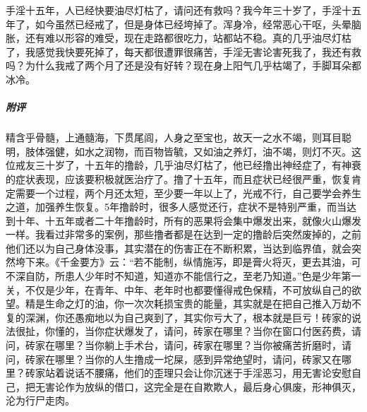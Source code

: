 \begin{case}
    手淫十五年，人已经快要油尽灯枯了，请问还有救吗？我今年三十岁了，手淫十五年了，如今虽然已经戒了，但是身体已经垮掉了。浑身冷，经常恶心干呕，头晕脑胀，还有难以形容的难受，现在走路都很吃力，站都站不稳。真的几乎油尽灯枯了，我感觉我快要死掉了，每天都很遭罪很痛苦，手淫无害论害死我了，我还有救吗？为什么我戒了两个月了还是没有好转？现在身上阳气几乎枯竭了，手脚耳朵都冰冷。
    \subparagraph{附评} 精含乎骨髓，上通髓海，下贯尾闾，人身之至宝也，故天一之水不竭，则耳目聪明，肢体强健，如水之润物，而百物皆毓，又如油之养灯，油不竭，则灯不灭。这位戒友三十岁了，十五年的撸龄，几乎油尽灯枯了，他已经撸出神经症了，有神衰的症状表现，应该要积极就医治疗了。撸了十五年，而且症状已经很严重，恢复肯定需要一个过程，两个月还太短，至少要一年以上了，光戒不行，自己要学会养生之道，加强养生恢复。5年撸龄时，很多人感觉还行，症状不是特别严重，而当达到十年、十五年或者二十年撸龄时，所有的恶果将会集中爆发出来，就像火山爆发一样。我看过非常多的案例，那些撸者都是在达到一定的撸龄后突然废掉的，之前他们还以为自己身体没事，其实潜在的伤害正在不断积累，当达到临界值，就会突然垮下来。《千金要方》云：“若不能制，纵情施泻，即是膏火将灭，更去其油，可不深自防，所患人少年时不知道，知道亦不能信行之，至老乃知道。”色是少年第一关，不仅是少年，在青年、中年、老年时也都要懂得戒色保精，不可放纵自己的欲望。精是生命之灯的油，你一次次耗损宝贵的能量，其实就是在把自己推入万劫不复的深渊，你还愚痴地以为自己爽到了，其实你亏大了，根本就是巨亏！砖家的说法很扯，你懂的，当你症状爆发了，请问，砖家在哪里？当你在窗口付医药费，请问，砖家在哪里？当你躺上手术台，请问，砖家在哪里？当你被痛苦折磨时，请问，砖家在哪里？当你的人生撸成一坨屎，感到异常绝望时，请问，砖家又在哪里？砖家站着说话不腰痛，他们的歪理只会让你沉迷于手淫恶习，用无害论安慰自己，把无害论作为放纵的借口，这完全是在自欺欺人，最后身心俱废，形神俱灭，沦为行尸走肉。
\end{case}

